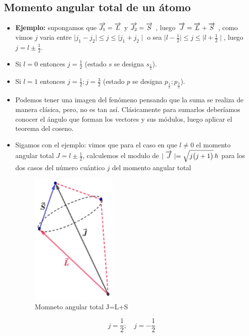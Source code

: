 \subsection{Momento angular total de un átomo}

\begin{itemize}
	\item \textbf{Ejemplo:} supongamos que $\overrightarrow{J_{1}}=\overrightarrow{L}$  y $\overrightarrow{J_{2}}=\overrightarrow{S}$ , luego $\overrightarrow{J}=\overrightarrow{L}+\overrightarrow{S}$ , como vimos $j$ varia entre $\mid j_{1}-j_{2} \mid \leq j \leq \mid j_{1}+j_{2} \mid$ o sea $\mid l-\frac{1}{2} \mid \leq j \leq \mid l+\frac{1}{2} \mid$, luego $j=l\pm\frac{1}{2}$.
	\item Si $l=0$ entonces $j=\frac{1}{2}$ (estado $s$ se designa $s_{\frac{1}{2}}$).	
	\item Si $l=1$ entonces $j=\frac{1}{2}; j=\frac{3}{2}$ (estado $p$ se designa $p_{\frac{1}{2}}; p_{\frac{3}{2}}$).
	\item Podemos tener una imagen del fenómeno pensando que la suma se realiza de manera clásica, pero, no es tan así. Clásicamente para sumarlos deberíamos conocer el ángulo que forman los vectores y sus módulos, luego aplicar el teorema del coseno.
	\item Sigamos con el ejemplo: vimos que para el caso en que $l\neq0$ el momento angular total $J=l\pm\frac{1}{2}$, calculemos el modulo de $\mid\overrightarrow{J}\mid =\sqrt{j\big(j+1\big)}\,\hbar$ para los dos casos del número cuántico $j$ del momento angular total


\begin{figure}[H]
    \centering
    \includegraphics[width=0.4\textwidth]{./Figures/GraficoJLS}
	\caption{Momneto angular total J=L+S}
	\label{fig:GraficoJLS}
\end{figure}



\begin{equation}
	j=\frac{1}{2} ;\quad j=-\frac{1}{2}
\end{equation}	
\end{itemize}

